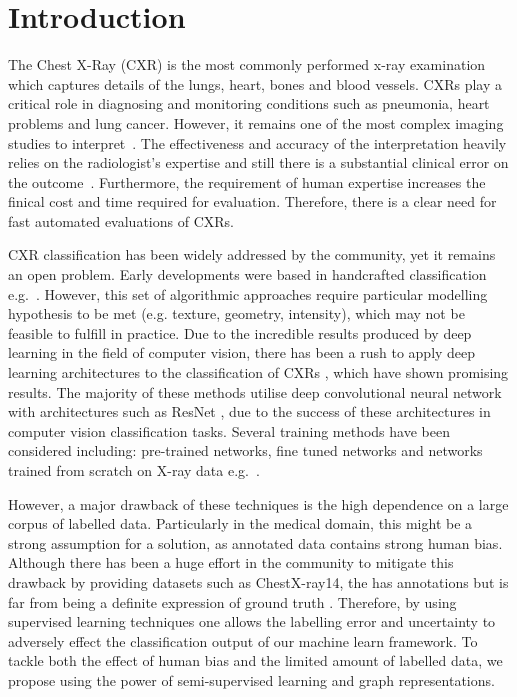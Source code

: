 \documentclass[runningheads]{llncs}
\begin{document}
\section{Introduction}
The Chest X-Ray (CXR) is the most commonly performed x-ray examination which captures details of the lungs, heart, bones and blood vessels. CXRs play a critical role in diagnosing and monitoring conditions such as pneumonia, heart problems and lung cancer. However, it remains one of the most complex imaging studies to interpret~\cite{folio2012chest}. The effectiveness and accuracy of the interpretation heavily relies on the radiologist's expertise and still there is a substantial clinical error on the outcome~\cite{bruno2015understanding}. Furthermore, the requirement of human expertise increases the finical cost and time required for evaluation. Therefore, there is a clear need for fast automated evaluations of CXRs.

CXR classification has been widely addressed by the community, yet it remains an open problem. Early developments were based in handcrafted classification e.g.~\cite{toriwaki1973pattern}. However, this set of algorithmic approaches require particular modelling hypothesis to be met (e.g. texture, geometry, intensity), which may not be feasible to fulfill in practice. Due to the incredible results produced by deep learning in the field of computer vision, there has been a rush to apply deep learning architectures to the classification of CXRs \cite{yao2018weakly,wang2017chestx,bar2015chest}, which have shown promising results. The majority of these methods utilise deep convolutional neural network with architectures
such as ResNet \cite{resnet2015}, due to the success of these architectures in computer vision classification tasks. Several training methods have been considered including: pre-trained networks, fine tuned networks and networks trained from scratch on X-ray data e.g.~\cite{yao2018weakly,wang2017chestx,bar2015chest}.

However, a major drawback of these techniques is the high dependence on a large corpus of labelled data. Particularly in the medical domain, this might be a strong assumption for a solution, as annotated data contains strong human bias. Although there has been a huge effort in the community to mitigate this drawback by providing datasets such as ChestX-ray14, the has annotations but is far from being a definite expression of ground truth \cite{kohli2017medical}.  Therefore, by using supervised learning techniques one allows the labelling error and uncertainty to adversely effect the classification output of our machine learn framework.
To tackle both the effect of human bias and the limited amount of labelled data, we propose using the power of semi-supervised learning and graph representations.
\end{document}
